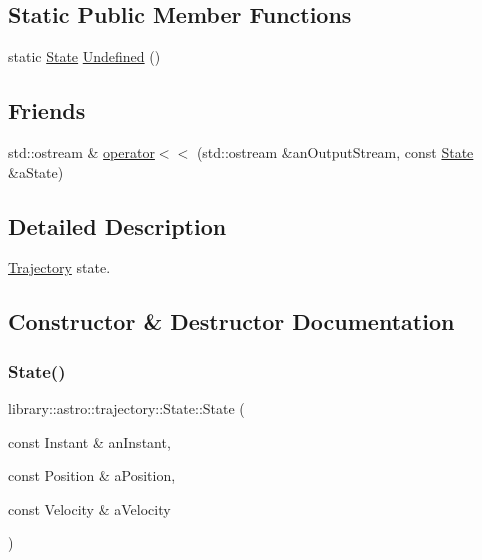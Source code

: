 \subsection*{Static Public Member Functions}
\begin{DoxyCompactItemize}
\item 
static \hyperlink{classlibrary_1_1astro_1_1trajectory_1_1_state}{State} \hyperlink{classlibrary_1_1astro_1_1trajectory_1_1_state_a1de5d9ea3f03d975b989fd519d447be7}{Undefined} ()
\end{DoxyCompactItemize}
\subsection*{Friends}
\begin{DoxyCompactItemize}
\item 
std\+::ostream \& \hyperlink{classlibrary_1_1astro_1_1trajectory_1_1_state_abba03f039f2534d691a1dc28426e8b89}{operator$<$$<$} (std\+::ostream \&an\+Output\+Stream, const \hyperlink{classlibrary_1_1astro_1_1trajectory_1_1_state}{State} \&a\+State)
\end{DoxyCompactItemize}


\subsection{Detailed Description}
\hyperlink{classlibrary_1_1astro_1_1_trajectory}{Trajectory} state. 

\subsection{Constructor \& Destructor Documentation}
\mbox{\label{classlibrary_1_1astro_1_1trajectory_1_1_state_ada1cbf99efb7e85f0a1f9664868b20f5}} 
\subsubsection{\texorpdfstring{State()}{State()}}
{\footnotesize\ttfamily library\+::astro\+::trajectory\+::\+State\+::\+State (\begin{DoxyParamCaption}\item[{const Instant \&}]{an\+Instant,  }\item[{const Position \&}]{a\+Position,  }\item[{const Velocity \&}]{a\+Velocity }\end{DoxyParamCaption})}



